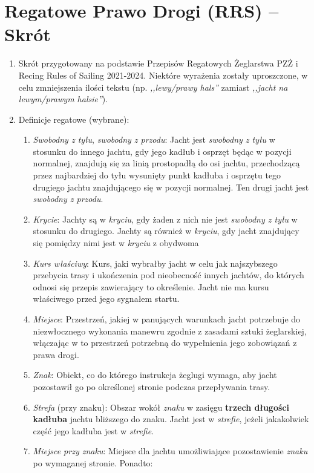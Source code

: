 \documentclass[12pt,a4paper]{article}
\begin{document}
\section{Regatowe Prawo Drogi (RRS) -- Skrót}
\label{sec:RegatowePrawoDrogi}
\begin{enumerate}
    \item Skrót przygotowany na podstawie Przepisów Regatowych Żeglarstwa PZŻ i Recing Rules of Sailing 2021-2024. Niektóre wyrażenia zostały uproszczone, w celu zmniejszenia ilości tekstu (np. \textit{,,lewy/prawy hals''} zamiast \textit{,,jacht na lewym/prawym halsie''}).
    \item Definicje regatowe (wybrane):
    \begin{enumerate}
        \item \textit{Swobodny z tyłu}, \textit{swobodny z przodu}: Jacht jest \textit{swobodny z tyłu} w stosunku do innego jachtu, gdy jego kadłub i osprzęt będąc w pozycji normalnej, znajdują się za linią prostopadłą do osi jachtu, przechodzącą przez najbardziej do tyłu wysunięty punkt kadłuba i osprzętu tego drugiego jachtu znajdującego się w pozycji normalnej.
        Ten drugi jacht jest \textit{swobodny z przodu}.
        \item \textit{Krycie}: Jachty są w \textit{kryciu}, gdy żaden z nich nie jest \textit{swobodny z tyłu} w stosunku do drugiego.
        Jachty są również w \textit{kryciu}, gdy jacht znajdujący się pomiędzy nimi jest w \textit{kryciu} z obydwoma
        \item \textit{Kurs właściwy}: Kurs, jaki wybrałby jacht w celu jak najszybszego przebycia trasy i ukończenia pod nieobecność innych jachtów, do których odnosi się przepis zawierający to określenie. Jacht nie ma kursu właściwego przed jego sygnałem startu.
        \item \textit{Miejsce}: Przestrzeń, jakiej w panujących warunkach jacht potrzebuje do niezwłocznego wykonania manewru zgodnie z zasadami sztuki żeglarskiej, włączając w to przestrzeń potrzebną do wypełnienia jego zobowiązań z prawa drogi.
        \item \textit{Znak}: Obiekt, co do którego instrukcja żeglugi wymaga, aby jacht pozostawił go po określonej stronie podczas przepływania trasy.
        \item \textit{Strefa} (przy znaku): Obszar wokół \textit{znaku} w zasięgu \textbf{trzech długości kadłuba} jachtu bliższego do znaku.
        Jacht jest w \textit{strefie}, jeżeli jakakolwiek część jego kadłuba jest w \textit{strefie}.
        \item \textit{Miejsce przy znaku}: Miejsce dla jachtu umożliwiające pozostawienie \textit{znaku} po wymaganej stronie. Ponadto: 

\end{enumerate}
\end{enumerate}
\end{document}
